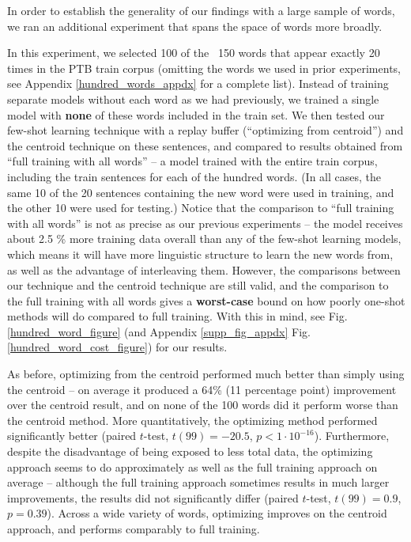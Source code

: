 \documentclass{article}
\begin{document}
In order to establish the generality of our findings with a large sample of words, we ran an additional experiment that spans the space of words more broadly. \par
In this experiment, we selected 100 of the ~150 words that appear exactly 20 times in the PTB train corpus (omitting the words we used in prior experiments, see Appendix \ref{hundred_words_appdx} for a complete list). Instead of training separate models without each word as we had previously, we trained a single model with \textbf{none} of these words included in the train set. We then tested our few-shot learning technique with a replay buffer (“optimizing from centroid”) and the centroid technique on these sentences, and compared to results obtained from “full training with all words” -- a model trained with the entire train corpus, including the train sentences for each of the hundred words. (In all cases, the same 10 of the 20 sentences containing the new word were used in training, and the other 10 were used for testing.) Notice that the comparison to ``full training with all words'' is not as precise as our previous experiments -- the model receives about 2.5 \% more training data overall than any of the few-shot learning models, which means it will have more linguistic structure to learn the new words from, as well as the advantage of interleaving them. However, the comparisons between our technique and the centroid technique are still valid, and the comparison to the full training with all words gives a \textbf{worst-case} bound on how poorly one-shot methods will do compared to full training. With this in mind, see Fig. \ref{hundred_word_figure} (and Appendix \ref{supp_fig_appdx} Fig. \ref{hundred_word_cost_figure}) for our results.\par
As before, optimizing from the centroid performed much better than simply using the centroid -- on average it produced a 64\% (11 percentage point) improvement over the centroid result, and on none of the 100 words did it perform worse than the centroid method. More quantitatively, the optimizing method performed significantly better (paired \(t\)-test, \(t(99) = -20.5\), \(p < 1 \cdot 10^{-16}\)). Furthermore, despite the disadvantage of being exposed to less total data, the optimizing approach seems to do approximately as well as the full training approach on average -- although the full training approach sometimes results in much larger improvements, the results did not significantly differ (paired \(t\)-test, \(t(99)=0.9\), \(p=0.39\)). Across a wide variety of words, optimizing improves on the centroid approach, and performs comparably to full training. \par
\end{document}
